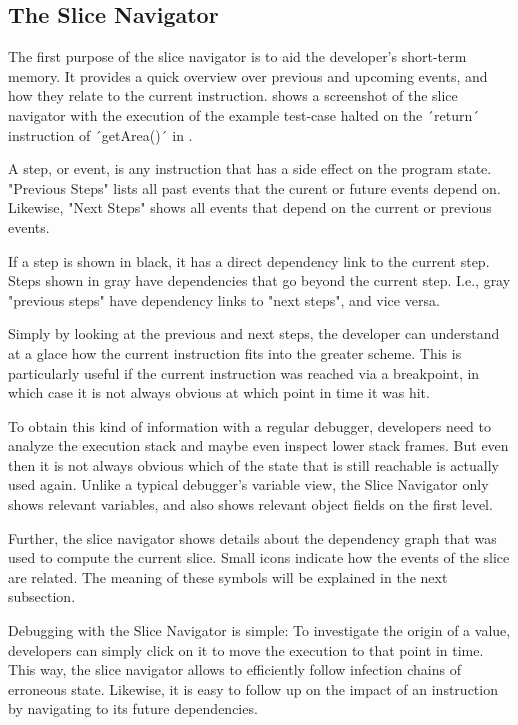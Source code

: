 ﻿\documentclass[
      english,
			conference,
      ]{IEEEtran}
\begin{document}
\subsection{The Slice Navigator}

The first purpose of the slice navigator is to aid the developer's short-term memory.
It provides a quick overview over previous and upcoming events, and how they relate to the current instruction.
 shows a screenshot of the slice navigator with the execution of the example test-case halted on the ´return´ instruction of ´getArea()´ in .

A step, or event, is any instruction that has a side effect on the program state.
"Previous Steps" lists all past events that the curent or future events depend on.
Likewise, "Next Steps" shows all events that depend on the current or previous events.

If a step is shown in black, it has a direct dependency link to the current step.
Steps shown in gray have dependencies that go beyond the current step.
I.e., gray "previous steps" have dependency links to "next steps", and vice versa.

Simply by looking at the previous and next steps, the developer can understand at a glace how the current instruction fits into the greater scheme.
This is particularly useful if the current instruction was reached via a breakpoint, in which case it is not always obvious at which point in time it was hit.

To obtain this kind of information with a regular debugger, developers need to analyze the execution stack and maybe even inspect lower stack frames.
But even then it is not always obvious which of the state that is still reachable is actually used again.
Unlike a typical debugger's variable view, the Slice Navigator only shows relevant variables, and also shows relevant object fields on the first level.

Further, the slice navigator shows details about the dependency graph that was used to compute the current slice.
Small icons indicate how the events of the slice are related.
The meaning of these symbols will be explained in the next subsection.

Debugging with the Slice Navigator is simple:
To investigate the origin of a value, developers can simply click on it to move the execution to that point in time.
This way, the slice navigator allows to efficiently follow infection chains of erroneous state.
Likewise, it is easy to follow up on the impact of an instruction by navigating to its future dependencies.
\end{document}
